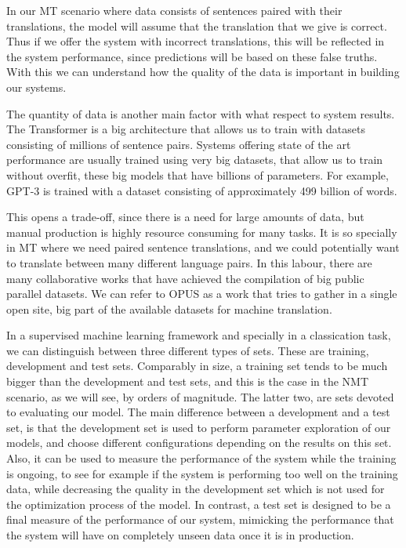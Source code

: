 \documentclass[11pt,english,listoffigures,listoftables]{tfgetsinf}
\begin{document}
In our MT scenario where data consists of sentences paired with their translations, the model will assume that the translation that we give is correct. Thus if we offer the system with incorrect translations, this will be reflected in the system performance, since predictions will be based on these false truths. With this we can understand how the quality of the data is important in building our systems.

The quantity of data is another main factor with what respect to system results. The Transformer is a big architecture that allows us to train with datasets consisting of millions of sentence pairs. Systems offering state of the art performance are usually trained using very big datasets, that allow us to train without overfit, these big models that have billions of parameters. For example, GPT-3 \cite{https://doi.org/10.48550/arxiv.2005.14165} is trained with a dataset consisting of approximately 499 billion of words.

This opens a trade-off, since there is a need for large amounts of data, but manual production is highly resource consuming for many tasks. It is so specially in MT where we need paired sentence translations, and we could potentially want to translate between many different language pairs. In this labour, there are many collaborative works that have achieved the compilation of big public parallel datasets. We can refer to OPUS \cite{aulamo-tiedemann-2019-opus} as a work that tries to gather in a single open site, big part of the available datasets for machine translation.

In a supervised machine learning framework and specially in a classication task, we can distinguish between three different types of sets. These are training, development and test sets. Comparably in size, a training set tends to be much bigger than the development and test sets, and this is the case in the NMT scenario, as we will see, by orders of magnitude. The latter two, are sets devoted to evaluating our model. The main difference between a development and a test set, is that the development set is used to perform parameter exploration of our models, and choose different configurations depending on the results on this set. Also, it can be used to measure the performance of the system while the training is ongoing, to see for example if the system is performing too well on the training data, while decreasing the quality in the development set which is not used for the optimization process of the model. In contrast, a test set is designed to be a final measure of the performance of our system, mimicking the performance that the system will have on completely unseen data once it is in production.
\end{document}
